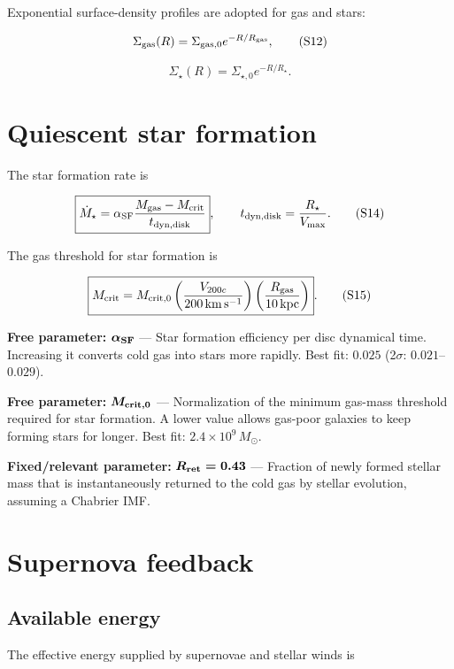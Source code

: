 \documentclass[11pt,a4paper]{article}
\newcommand{\freeparam}[2]{%
  \colorbox{freeblue}{\parbox{0.95\linewidth}{\textbf{Free parameter:} $\boldsymbol{#1}$ --- #2}}%
}
\newcommand{\fixedparam}[2]{%
  \colorbox{fixedgray}{\parbox{0.95\linewidth}{\textbf{Fixed/relevant parameter:} $\boldsymbol{#1}$ --- #2}}%
}
\begin{document}
Exponential surface-density profiles are adopted for gas and stars:

\begin{equation}
 \Sigma_{\rm gas}(R)=\Sigma_{{\rm gas},0}e^{-R/R_{\rm gas}},
 \tag{S12}
\end{equation}

\begin{equation}
 \Sigma_\star(R)=\Sigma_{\star,0}e^{-R/R_\star}.
 \tag{S13}
\end{equation}

\section{Quiescent star formation}
The star formation rate is

\begin{equation}
 \boxed{\dot M_\star=\alpha_{\rm SF}
 \frac{M_{\rm gas}-M_{\rm crit}}{t_{\rm dyn,disk}}},
 \qquad
 t_{\rm dyn,disk}=\frac{R_\star}{V_{\max}}.
 \tag{S14}
\end{equation}

The gas threshold for star formation is

\begin{equation}
 \boxed{M_{\rm crit}=M_{{\rm crit},0}
 \left(\frac{V_{200c}}{200\,\mathrm{km\,s^{-1}}}\right)
 \left(\frac{R_{\rm gas}}{10\,\mathrm{kpc}}\right)}.
 \tag{S15}
\end{equation}

\freeparam{\alpha_{\rm SF}}{Star formation efficiency per disc dynamical time. Increasing it converts cold gas into stars more rapidly. Best fit: $0.025$ (2$\sigma$: $0.021$--$0.029$).}

\freeparam{M_{{\rm crit},0}}{Normalization of the minimum gas-mass threshold required for star formation. A lower value allows gas-poor galaxies to keep forming stars for longer. Best fit: $2.4\times10^9\,M_\odot$.}

\fixedparam{R_{\rm ret}=0.43}{Fraction of newly formed stellar mass that is instantaneously returned to the cold gas by stellar evolution, assuming a Chabrier IMF.}

\section{Supernova feedback}
\subsection{Available energy}
The effective energy supplied by supernovae and stellar winds is
\end{document}
